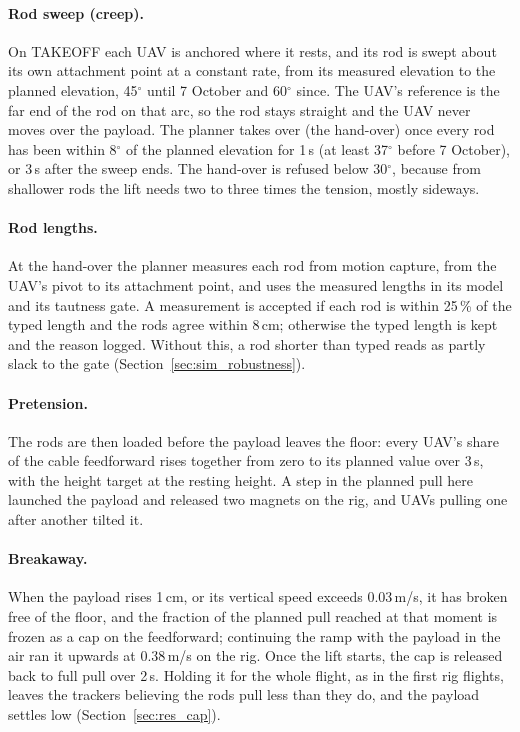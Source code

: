 \paragraph{Rod sweep (creep).} On TAKEOFF each UAV is anchored where it rests, and its rod is swept about
its own attachment point at a constant rate, from its measured elevation to the planned elevation, 45$^\circ$
until 7 October and 60$^\circ$ since. The UAV's reference is the far end of the rod on that arc, so the rod stays
straight and the UAV never moves over the payload. The planner takes over (the hand-over) once every rod has
been within 8$^\circ$ of the planned elevation for 1\,s (at least 37$^\circ$ before 7 October), or 3\,s after
the sweep ends. The hand-over is refused below 30$^\circ$, because from
shallower rods the lift needs two to three times the tension, mostly sideways.

\paragraph{Rod lengths.} At the hand-over the planner measures each rod from motion capture, from the
UAV's pivot to its attachment point, and uses the measured lengths in its model and its tautness gate.
A measurement is accepted if each rod is within 25\,\% of the typed length and the rods agree within
8\,cm; otherwise the typed length is kept and the reason logged. Without this, a rod shorter than typed
reads as partly slack to the gate (Section~\ref{sec:sim_robustness}).

\paragraph{Pretension.} The rods are then loaded before the payload leaves the floor: every UAV's share
of the cable feedforward rises together from zero to its planned value over 3\,s, with the height target
at the resting height. A step in the planned pull here launched the payload and released two magnets on
the rig, and UAVs pulling one after another tilted it.

\paragraph{Breakaway.} When the payload rises 1\,cm, or its vertical speed exceeds 0.03\,m/s, it has broken
free of the floor, and the fraction of the planned pull reached at that moment is frozen as a cap on the
feedforward; continuing the ramp with the payload in the air ran it upwards at 0.38\,m/s on the rig. Once
the lift starts, the cap is released back to full pull over 2\,s. Holding it for the whole flight, as in
the first rig flights, leaves the trackers believing the rods pull less than they do, and the payload
settles low (Section~\ref{sec:res_cap}).


